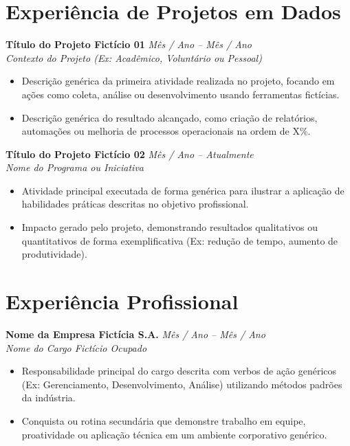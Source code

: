\documentclass[11pt,a4paper]{article}
\begin{document}
\section*{Experi\^encia de Projetos em Dados}
\vspace{6pt}
\noindent
\textbf{T\'itulo do Projeto Fict\'icio 01} \hfill \textit{M\^es / Ano -- M\^es / Ano} \\
\textit{Contexto do Projeto (Ex: Acad\^emico, Volunt\'ario ou Pessoal)}
\begin{itemize}
    \item Descri\c{c}\~ao gen\'erica da primeira atividade realizada no projeto, focando em a\c{c}\~oes como coleta, an\'alise ou desenvolvimento usando ferramentas fict\'icias.
    \item Descri\c{c}\~ao gen\'erica do resultado alcan\c{c}ado, como cria\c{c}\~ao de relat\'orios, automa\c{c}\~oes ou melhoria de processos operacionais na ordem de X\%.
\end{itemize}

\vspace{6pt}
\noindent
\textbf{T\'itulo do Projeto Fict\'icio 02} \hfill \textit{M\^es / Ano -- Atualmente} \\
\textit{Nome do Programa ou Iniciativa}
\begin{itemize}
    \item Atividade principal executada de forma gen\'erica para ilustrar a aplica\c{c}\~ao de habilidades pr\'aticas descritas no objetivo profissional.
    \item Impacto gerado pelo projeto, demonstrando resultados qualitativos ou quantitativos de forma exemplificativa (Ex: redu\c{c}\~ao de tempo, aumento de produtividade).
\end{itemize}

\section*{Experi\^encia Profissional}
\vspace{6pt}
\noindent
\textbf{Nome da Empresa Fict\'icia S.A.} \hfill \textit{M\^es / Ano -- M\^es / Ano} \\
\textit{Nome do Cargo Fict\'icio Ocupado}
\begin{itemize}
    \item Responsabilidade principal do cargo descrita com verbos de a\c{c}\~ao gen\'ericos (Ex: Gerenciamento, Desenvolvimento, An\'alise) utilizando m\'etodos padr\~oes da ind\'ustria.
    \item Conquista ou rotina secund\'aria que demonstre trabalho em equipe, proatividade ou aplica\c{c}\~ao t\'ecnica em um ambiente corporativo gen\'erico.
\end{itemize}
\end{document}
